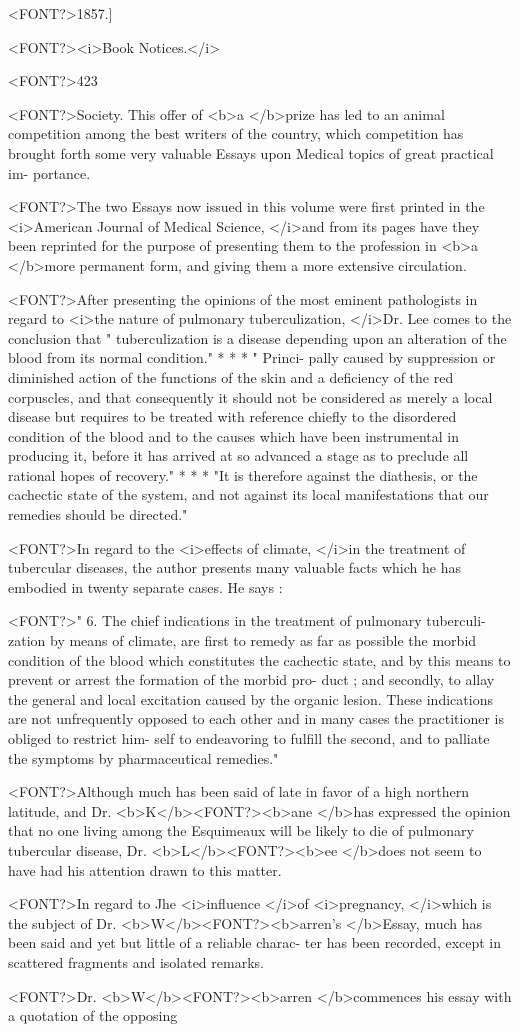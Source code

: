 <FONT?>1857.]

<FONT?><i>Book Notices.</i>

<FONT?>423

<FONT?>Society. This offer of <b>a </b>prize has led to an animal competition among
the best writers of the country, which competition has brought forth
some very valuable Essays upon Medical topics of great practical im-
portance.

<FONT?>The two Essays now issued in this volume were first printed in the
<i>American Journal of Medical Science, </i>and from its pages have they
been reprinted for the purpose of presenting them to the profession in
<b>a </b>more permanent form, and giving them a more extensive circulation.

<FONT?>After presenting the opinions of the most eminent pathologists in
regard to <i>the nature of pulmonary tuberculization, </i>Dr. Lee comes to
the conclusion that " tuberculization is a disease depending upon an
alteration of the blood from its normal condition." * * * " Princi-
pally caused by suppression or diminished action of the functions of the
skin and a deficiency of the red corpuscles, and that consequently it
should not be considered as merely a local disease but requires to be
treated with reference chiefly to the disordered condition of the blood
and to the causes which have been instrumental in producing it, before
it has arrived at so advanced a stage as to preclude all rational hopes
of recovery." * * * "It is therefore against the diathesis, or the
cachectic state of the system, and not against its local manifestations
that our remedies should be directed."

<FONT?>In regard to the <i>effects of climate, </i>in the treatment of tubercular
diseases, the author presents many valuable facts which he has embodied
in twenty separate cases.   He says :

<FONT?>" 6. The chief indications in the treatment of pulmonary tuberculi-
zation by means of climate, are first to remedy as far as possible the
morbid condition of the blood which constitutes the cachectic state, and
by this means to prevent or arrest the formation of the morbid pro-
duct ; and secondly, to allay the general and local excitation caused by
the organic lesion. These indications are not unfrequently opposed to
each other and in many cases the practitioner is obliged to restrict him-
self to endeavoring to fulfill the second, and to palliate the symptoms
by pharmaceutical remedies."

<FONT?>Although much has been said of late in favor of a high northern
latitude, and Dr. <b>K</b><FONT?><b>ane </b>has expressed the opinion that no one living
among the Esquimeaux will be likely to die of pulmonary tubercular
disease, Dr. <b>L</b><FONT?><b>ee </b>does not seem to have had his attention drawn to this
matter.

<FONT?>In regard to Jhe <i>influence </i>of <i>pregnancy, </i>which is the subject of Dr.
<b>W</b><FONT?><b>arren's </b>Essay, much has been said and yet but little of a reliable charac-
ter has been recorded, except in scattered fragments and isolated remarks.

<FONT?>Dr. <b>W</b><FONT?><b>arren </b>commences his essay with a quotation of the opposing\endinput
